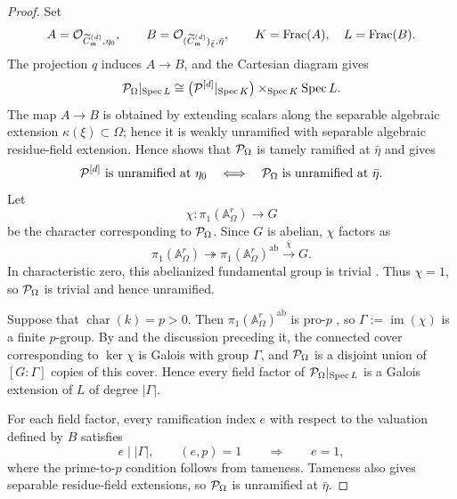 \begin{proof}
Set
\[
    A=\mathcal{O}_{\widetilde{C}_{\mathfrak{m}}^{(d)},\eta_0},\qquad
    B=\mathcal{O}_{(\widetilde{C}_{\mathfrak{m}}^{(d)})_{\bar\xi},\bar\eta},\qquad
    K=\operatorname{Frac}(A),\quad L=\operatorname{Frac}(B).
\]
The projection $q$ induces $A\to B$, and the Cartesian diagram gives
\[
    \mathcal{P}_\Omega|_{\operatorname{Spec} L}
    \cong\bigl(\mathcal{P}^{[d]}|_{\operatorname{Spec} K}\bigr)
    \times_{\operatorname{Spec} K}\operatorname{Spec} L.
\]
The map $A\to B$ is obtained by extending scalars along the separable
algebraic extension $\kappa(\xi)\subset\Omega$; hence it is weakly
unramified with separable algebraic residue-field extension.
Hence  shows that
$\mathcal{P}_\Omega$ is tamely ramified at $\bar\eta$ and gives
\[
    \mathcal{P}^{[d]}\text{ is unramified at }\eta_0
    \quad\Longleftrightarrow\quad
    \mathcal{P}_\Omega\text{ is unramified at }\bar\eta.
\]
Let
\[
    \chi:\pi_1(\mathbb A^r_\Omega)\longrightarrow G
\]
be the character corresponding to $\mathcal{P}_\Omega$.
Since $G$ is abelian, $\chi$ factors as
\[
    \pi_1(\mathbb A^r_\Omega)
    \twoheadrightarrow\pi_1(\mathbb A^r_\Omega)^{\mathrm{ab}}
    \xrightarrow{\,\bar\chi\,}G.
\]
In characteristic zero, this abelianized fundamental group is trivial
\cite[Example~4.14]{tendler2015geometricclassfieldtheory}. Thus $\chi=1$,
so $\mathcal{P}_\Omega$ is trivial and hence unramified.

Suppose that $\operatorname{char}(k)=p>0$. Then
$\pi_1(\mathbb A^r_\Omega)^{\mathrm{ab}}$ is pro-$p$
\cite[Example~4.15]{tendler2015geometricclassfieldtheory}, so
$\Gamma:=\operatorname{im}(\chi)$ is a finite $p$-group.
By  and the discussion
preceding it, the connected cover corresponding to $\ker\chi$ is Galois
with group $\Gamma$, and $\mathcal{P}_\Omega$ is a disjoint union of
$[G:\Gamma]$ copies of this cover.
Hence every field factor of $\mathcal{P}_\Omega|_{\operatorname{Spec} L}$ is a Galois extension
of $L$ of degree $|\Gamma|$.

For each field factor, every ramification index $e$ with respect to the
valuation defined by $B$ satisfies
\[
    e\mid |\Gamma|,\qquad (e,p)=1
    \qquad\Longrightarrow\qquad e=1,
\]
where the prime-to-$p$ condition follows from tameness. Tameness also gives
separable residue-field extensions, so $\mathcal{P}_\Omega$ is unramified at
$\bar\eta$.
\end{proof}

